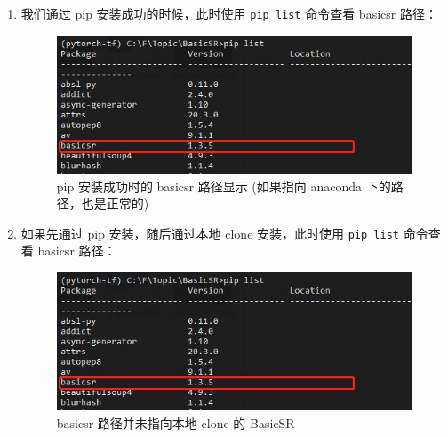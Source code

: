 \documentclass[../main.tex]{subfiles}
\begin{document}
\begin{enumerate}
\begin{enumerate}
    \item 我们通过 pip 安装成功的时候，此时使用 \texttt{pip list} 命令查看 basicsr 路径：
    \begin{figure}[H]
    \begin{center}
        \includegraphics[width=0.7\linewidth]{figures/installation_pip_install_location.jpg}
        \caption{pip 安装成功时的 basicsr 路径显示 (如果指向 anaconda 下的路径，也是正常的)}
        \label{fig:correct-pip-install}
    \end{center}
    \vspace{-0.5cm}
    \end{figure}

    \item 如果先通过 pip 安装，随后通过本地 clone 安装，此时使用 \texttt{pip list} 命令查看 basicsr 路径：
    \begin{figure}[H]
    \begin{center}
        \includegraphics[width=0.7\linewidth]{figures/installation_pip_install_location.jpg}
        \caption{basicsr 路径并未指向本地 clone 的 BasicSR}
        \label{fig:false-clone-install}
    \end{center}
    \vspace{-0.5cm}
    \end{figure}


\end{enumerate}
\end{enumerate}
\end{document}
